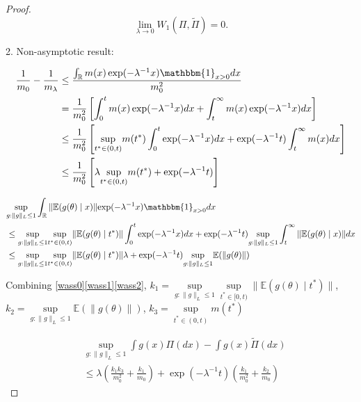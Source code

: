 \documentclass[10pt,fleqn]{article}
\DeclareMathOperator{\1}{\mathbbm{1}}
\begin{document}
\begin{proof}[Proof]
\begin{equation}
\underset{\lambda \rightarrow 0}\lim W_1(\Pi,\tilde\Pi)=0.        \end{equation}

2. Non-asymptotic result:


\begin{equation}
\label{wass1}
\begin{aligned}
\frac{1}{m_0}-\frac{1}{m_\lambda} & \le  \frac{   \int_\mathbb{R}  m(x) \exp(- \lambda^{-1} x ) \mathbbm{1}_{x > 0}  d x } {  m_0^2}  \\
&= \frac{1}{ m_0^2} \left[ \int_0^{t}  m(x) \exp(- \lambda^{-1} x ) dx + \int_t^{\infty}  m(x) \exp(- \lambda^{-1} x ) dx \right] \\
&\le \frac{1}{ m_0^2} \left[  \underset{t^*\in (0,t)}\sup m(t^{*})\int_0^{t} \exp(- \lambda^{-1} x ) dx + \exp(- \lambda^{-1} t )\int_t^{\infty}  m(x) dx  \right] \\
&\le \frac{1}{ m_0^2} \left[\lambda \underset{t^*\in (0,t)}\sup  m(t^{*})  + \exp(- \lambda^{-1} t ) \right] 
\end{aligned}
\end{equation}

\begin{equation}
\label{wass2}
\begin{aligned}
& \underset{g:\|g\|_L\le 1}\sup\int_\mathbb{R}  \|\mathbb{E}(g(\theta) \mid x)\| { \exp(- \lambda^{-1} x)}  \mathbbm{1}_{x > 0} d x \\
&\le \underset{g:\|g\|_L\le 1}\sup\underset{t^*\in (0,t)}\sup \|\mathbb{E}(g(\theta) \mid t^*)\|     
\int_0^{t} \exp(- \lambda^{-1} x ) dx + \exp(- \lambda^{-1} t ) \underset{g:\|g\|_L\le 1}\sup \int_t^{\infty}   \|\mathbb{E}( g(\theta )\mid x)\| dx \\
&\le \underset{g:\|g\|_L\le 1}\sup\underset{t^*\in (0,t)}\sup \|\mathbb{E}(g(\theta) \mid t^*)\|     \lambda + \exp(- \lambda^{-1} t ) \underset{g:\|g\|_L\le 1} \sup \mathbb{E}(\| g(\theta )\|) \\
\end{aligned}
\end{equation}

Combining \eqref{wass0}\eqref{wass1}\eqref{wass2}, $k_1=\underset{g:\|g\|_L\le 1}\sup\underset{t^*\in [0,t)}\sup \|\mathbb{E}(g(\theta) \mid t^*)\|$, $k_2=\underset{g:\|g\|_L\le 1} \sup \mathbb{E}(\| g(\theta )\|)$, $k_3= \underset{t^*\in (0,t)}\sup  m(t^{*})$


\begin{equation}
\begin{aligned}
& \underset{g:\|g\|_L\le 1}\sup \int g(x) \Pi(dx) -  \int g(x) \tilde\Pi(dx) \\
        & \le \lambda (\frac{k_1 k_3}{m_0^2} + \frac{k_1}{m_0}) + \exp(- \lambda^{-1} t )(\frac{k_1}{m_0^2} + \frac{k_2}{m_0})
        \end{aligned}
        \end{equation}


        \end{proof}
\end{document}
